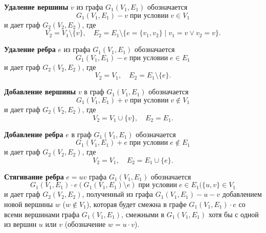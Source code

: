 \textbf{Удаление вершины} \(v\) из графа \(G_1 (V_1, E_1)\) обозначается
\[
    G_1 (V_1, E_1) - v
    \; \text{при условии} \;
    v \in V_1
\]
и дает граф \(G_2 (V_2, E_2)\), где
\[
    V_2 = V_1 \setminus \{v\},
    \quad
    E_2 = E_1 \setminus \{e = \{v_1, v_2\} \mid v_1 = v \lor v_2 = v\}.
\]

\textbf{Удаление ребра} \(e\) из графа \(G_1 (V_1, E_1)\) обозначается
\[
    G_1 (V_1, E_1) - e
    \; \text{при условии} \;
    e \in E_1
\]
и дает граф \(G_2 (V_2, E_2)\), где
\[
    V_2 = V_1,
    \quad
    E_2 = E_1 \setminus \{e\}.
\]

\textbf{Добавление вершины} \(v\) в граф \(G_1 (V_1, E_1)\) обозначается
\[
    G_1 (V_1, E_1) + v
    \; \text{при условии} \;
    v \notin V_1
\]
и дает граф \(G_2 (V_2, E_2)\), где
\[
    V_2 = V_1 \cup \{v\},
    \quad
    E_2 = E_1.
\]

\textbf{Добавление ребра} \(e\) в граф \(G_1 (V_1, E_1)\) обозначается
\[
    G_1 (V_1, E_1) + e
    \; \text{при условии} \;
    e \notin E_1
\]
и дает граф \(G_2 (V_2, E_2)\), где
\[
    V_2 = V_1,
    \quad
    E_2 = E_1 \cup \{e\}.
\]

\textbf{Стягивание ребра} \(e = uv\) графа \(G_1 (V_1, E_1)\) обозначается
\[
    G_1 (V_1, E_1) \cdot e(G_1 (V_1, E_1) \setminus e)
    \; \text{при условии} \;
    e \in E_1 (\{u, v\} \in V_1
\]
и дает граф \(G_2 (V_2, E_2)\), полученный из графа \(G_1 (V_1, E_1) - u - v\) добавлением новой вершины \(w\) (\(w \notin V_1\)), которая будет смежна в графе \(G_1 (V_1, E_1) \cdot e\) со всеми вершинами графа \(G_1 (V_1, E_1)\), смежными в \(G_1 (V_1, E_1)\) хотя бы с одной из вершин \(u\) или \(v\) (обозначение \(w = u \cdot v\)).
